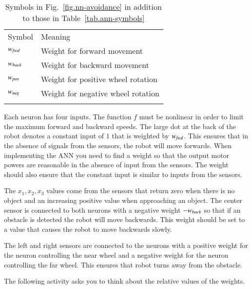 \begin{table}
\caption{Symbols in Fig.~\ref{fig.nn-avoidance} in addition to those in Table~\ref{tab.ann-symbols}}
\label{tab.obstacle-avoidance}
\begin{tabular}{p{2cm}p{5.5cm}}
\svhline\noalign{\smallskip}
Symbol & Meaning \\
\noalign{\smallskip}\svhline\noalign{\smallskip}
$w_{\textit{\scriptsize fwd}}$ & Weight for forward movement\\
$w_{\textit{\scriptsize back}}$ & Weight for backward movement\\
$w_{\textit{\scriptsize pos}}$ & Weight for positive wheel rotation\\
$w_{\textit{\scriptsize neg}}$ & Weight for negative wheel rotation\\
\noalign{\smallskip}\svhline\noalign{\smallskip}
\end{tabular}
\end{table}

Each neuron has four inputs. The function $f$ must be nonlinear in order to limit the maximum forward and backward speeds. The large dot at the back of the robot denotes a constant input of $1$ that is weighted by $w_{\textit{\scriptsize fwd}}$. This ensures that in the absence of signals from the sensors, the robot will move forwards. When implementing the ANN you need to find a weight so that the output motor powers are reasonable in the absence of input from the sensors. The weight should also ensure that the constant input is similar to inputs from the sensors.

The $x_1, x_2, x_3$ values come from the sensors that return zero when there is no object and an increasing positive value when approaching an object. The center sensor is connected to both neurons with a negative weight $-w_{\textit{\scriptsize back}}$ so that if an obstacle is detected the robot will move backwards. This weight should be set to a value that causes the robot to move backwards slowly.

The left and right sensors are connected to the neurons with a positive weight for the neuron controlling the near wheel and a negative weight for the neuron controlling the far wheel. This ensures that robot turns away from the obstacle.

The following activity asks you to think about the relative values of the weights.

